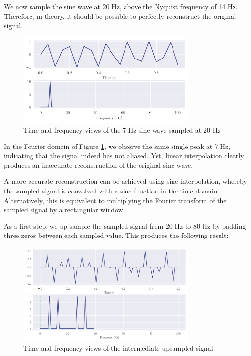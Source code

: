 \documentclass[a4paper, 11pt]{article}
\begin{document}
We now sample the sine wave at 20 Hz, above the Nyquist frequency of 14 Hz.
Therefore, in theory, it should be possible to perfectly reconstruct the
original signal.
\begin{figure}[ht]
    \centering
    \includegraphics[width=0.8\textwidth]{images/q6_sampled.png}
    \caption{Time and frequency views of the 7 Hz sine wave sampled at 20 Hz}
    \label{fig:q6_sampled}
\end{figure}

In the Fourier domain of Figure \ref{fig:q6_sampled}, we observe the same single
peak at 7 Hz, indicating that the signal indeed has not aliased. Yet, linear
interpolation clearly produces an inaccurate reconstruction of the original sine
wave.

\newpage

A more accurate reconstruction can be achieved using sinc interpolation, whereby
the sampled signal is convolved with a sinc function in the time domain.
Alternatively, this is equivalent to multiplying the Fourier transform of the
sampled signal by a rectangular window.

As a first step, we up-sample the sampled signal from 20 Hz to 80 Hz by padding
three zeros between each sampled value. This produces the following result:

\begin{figure}[ht]
    \centering
    \includegraphics[width=0.8\textwidth]{images/q6_intermediate.png}
    \caption{Time and frequency views of the intermediate upsampled signal}
    \label{fig:q6_intermediate}
\end{figure}
\end{document}
